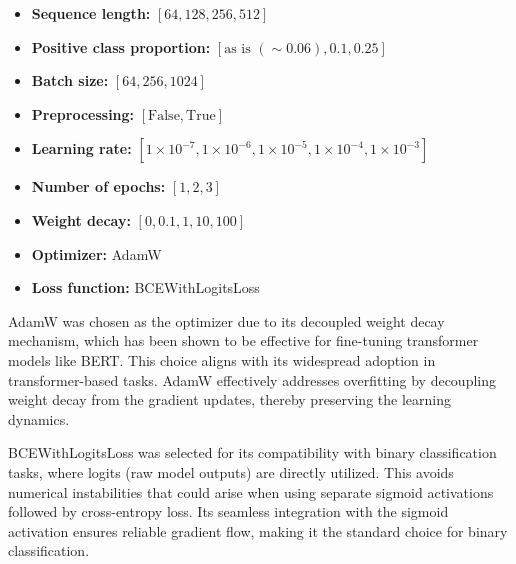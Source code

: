 \begin{itemize}
    \item \textbf{Sequence length:} $[64, 128, 256, 512]$
    \item \textbf{Positive class proportion:} $[\text{as is } (\sim 0.06), 0.1, 0.25]$
    \item \textbf{Batch size:} $[64, 256, 1024]$
    \item \textbf{Preprocessing:} $[\text{False}, \text{True}]$
    \item \textbf{Learning rate:} $[1 \times 10^{-7}, 1 \times 10^{-6}, 1 \times 10^{-5}, 1 \times 10^{-4}, 1 \times 10^{-3}]$
    \item \textbf{Number of epochs:} $[1, 2, 3]$
    \item \textbf{Weight decay:} $[0, 0.1, 1, 10, 100]$
    \item \textbf{Optimizer:} AdamW
    \item \textbf{Loss function:} BCEWithLogitsLoss
\end{itemize}

\noindent AdamW was chosen as the optimizer due to its decoupled weight decay mechanism, which has been shown to be effective for fine-tuning transformer models like BERT. This choice aligns with its widespread adoption in transformer-based tasks. AdamW effectively addresses overfitting by decoupling weight decay from the gradient updates, thereby preserving the learning dynamics. \cite{Nabila2024, Yagci2024, Putrada2023}

BCEWithLogitsLoss was selected for its compatibility with binary classification tasks, where logits (raw model outputs) are directly utilized. This avoids numerical instabilities that could arise when using separate sigmoid activations followed by cross-entropy loss. Its seamless integration with the sigmoid activation ensures reliable gradient flow, making it the standard choice for binary classification. \cite{PyTorch2023b}


